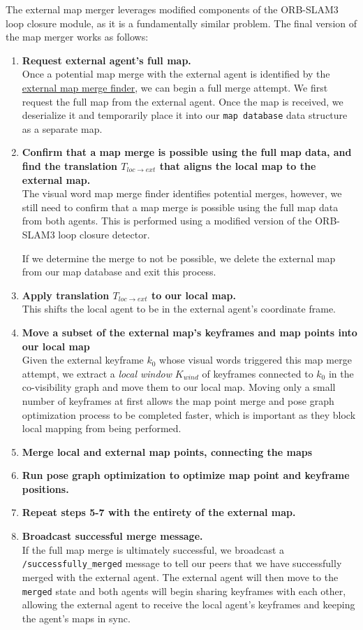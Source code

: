 The external map merger leverages modified components of the ORB-SLAM3 loop closure module, as it is a fundamentally similar problem. The final version of the map merger works as follows:

\begin{enumerate}
    \item \textbf{Request external agent's full map.} \\
          Once a potential map merge with the external agent is identified by the \hyperref[sec:external-map-merge-finder]{external map merge finder}, we can begin a full merge attempt. We first request the full map from the external agent. Once the map is received, we deserialize it and temporarily place it into our \texttt{map database} data structure as a separate map.
    \item \textbf{Confirm that a map merge is possible using the full map data, and find the translation $T_{loc \rightarrow ext}$ that aligns the local map to the external map.} \\
          The visual word map merge finder identifies potential merges, however, we still need to confirm that a map merge is possible using the full map data from both agents. This is performed using a modified version of the ORB-SLAM3 loop closure detector.

          If we determine the merge to not be possible, we delete the external map from our map database and exit this process.
    \item \textbf{Apply translation $T_{loc \rightarrow ext}$ to our local map.} \\
          This shifts the local agent to be in the external agent's coordinate frame.
    \item \textbf{Move a subset of the external map's keyframes and map points into our local map} \\
          Given the external keyframe $k_0$ whose visual words triggered this map merge attempt, we extract a \textit{local window} $K_{wind}$ of keyframes connected to $k_0$ in the co-visibility graph and move them to our local map. Moving only a small number of keyframes at first allows the map point merge and pose graph optimization process to be completed faster, which is important as they block local mapping from being performed.
    \item \textbf{Merge local and external map points, connecting the maps}
    \item \textbf{Run pose graph optimization to optimize map point and keyframe positions.}
    \item \textbf{Repeat steps 5-7 with the entirety of the external map.}
    \item \textbf{Broadcast successful merge message.} \\
          If the full map merge is ultimately successful, we broadcast a \texttt{/successfully\_merged} message to tell our peers that we have successfully merged with the external agent. The external agent will then move to the \texttt{merged} state and both agents will begin sharing keyframes with each other, allowing the external agent to receive the local agent's keyframes and keeping the agent's maps in sync.


\end{enumerate}
